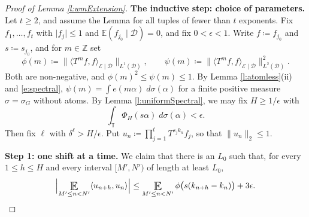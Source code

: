 \begin{proof}[Proof of Lemma \ref{l:wmExtension}]
\medskip
\noindent\textbf{The inductive step: choice of parameters.}
Let $t \geq 2$, and assume the Lemma for all tuples of fewer than $t$ exponents.
Fix $f_1 , \ldots, f_t$ with $\lvert f_j\rvert \leq 1$ and $\mathbb E(f_{j_0}\mid \mathcal D) = 0$, and fix $0< \epsilon <1$.
Write $f \coloneqq f_{j_0}$ and $s \coloneqq s_{j_0}$, and for $m \in \mathbb Z$ set
\begin{equation} \label{e:phipsi}
\phi (m) \coloneqq \bigl\lVert \langle T ^{m}f, f\rangle _{\mathcal E\mid \mathcal D}\bigr\rVert _{L ^{1}(\mathcal D)},
\qquad
\psi (m) \coloneqq \bigl\lVert \langle T ^{m}f, f\rangle _{\mathcal E\mid \mathcal D}\bigr\rVert _{L ^{2}(\mathcal D)} ^2 .
\end{equation}
Both are non-negative, and $\phi (m) ^2 \leq \psi (m) \leq 1$.
By Lemma \ref{l:atomless}(ii) and \eqref{e:spectral}, $\psi (m) = \int e(m \alpha )\;d \sigma ( \alpha )$ for a finite positive measure $\sigma = \sigma _G$ without atoms.
By Lemma \ref{l:uniformSpectral}, we may fix $H \geq 1/ \epsilon$ with
\begin{equation} \label{e:Hchoice}
\int_{\mathbb T} \Phi _H (s \alpha ) \;d \sigma ( \alpha ) < \epsilon .
\end{equation}
Then fix $\ell$ with $\delta ^{\ell} > H/\epsilon$.
Put $u_n \coloneqq \prod _{j=1}^t T ^{s_jk_n}f_j$, so that $\lVert u_n\rVert _2 \leq 1$.

\medskip
\noindent\textbf{Step 1: one shift at a time.}
We claim that there is an $L_0$ such that, for every $1 \leq h \leq H$ and every interval $[M',N')$ of length at least $L_0$,
\begin{equation} \label{e:perShift}
\Bigl\lvert \Expectation_{M'\leq n<N'} \langle u_{n+h}, u_n\rangle \Bigr\rvert
\leq \Expectation_{M'\leq n<N'} \phi \bigl( s(k_{n+h}-k_n)\bigr) + 3 \epsilon .
\end{equation}


\end{proof}
